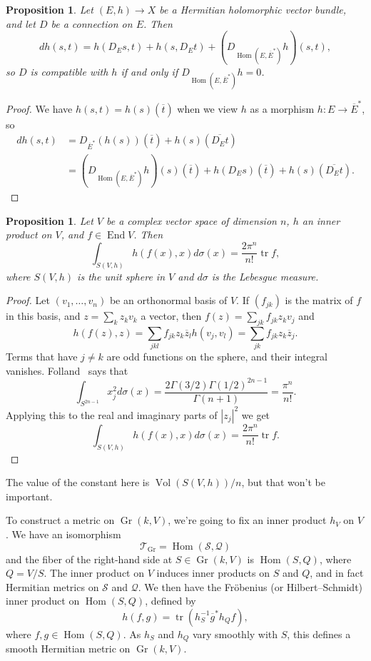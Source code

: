 \documentclass[11pt]{article}
\newtheorem{prop}[theo]{Proposition}
\newtheorem*{proof}{Proof}
\newcommand{\cc}[1]{\mathcal{#1}}
\def\ov#1{\overline{#1}}
\DeclareMathOperator{\Gr}{Gr}
\DeclareMathOperator{\Vol}{Vol}
\DeclareMathOperator{\End}{End}
\DeclareMathOperator{\Hom}{Hom}
\DeclareMathOperator{\tr}{tr}
\begin{document}
\begin{prop}
\label{prop:metric-parallel}
Let $(E,h) \to X$ be a Hermitian holomorphic vector bundle, and let $D$ be a connection on $E$. Then
\[
d h(s,t)
= h(D_Es, t) + h(s, D_Et)
+ (D_{\Hom(E,\overline E^*)}h)(s,t),
\]
so $D$ is compatible with $h$ if and only if $D_{\Hom(E,\overline E^*)}h = 0$.
\end{prop}

\begin{proof}
We have $h(s,t) = h(s)(\ov t)$ when we view $h$ as a morphism $h : E \to \ov E^*$, so
\begin{align*}
d h(s,t)
&= D_{\ov E^*}(h(s))(\ov t)
+ h(s)(\ov{D_Et})
\\
&= (D_{\Hom(E,\overline E^*)}h)(s)(\ov t)
+ h(D_E s)(\ov t)
+ h(s)(\ov{D_Et}).
\end{align*}
\end{proof}


\begin{prop}
\label{prop:trace-integral}
Let $V$ be a complex vector space of dimension $n$, $h$ an inner product on $V$, and $f \in \End V$. Then
\[
\int_{S(V,h)} h(f(x),x) d\sigma(x)
= \frac{2\pi^n}{n!} \tr f,
\]
where $S(V,h)$ is the unit sphere in $V$ and $d\sigma$ is the Lebesgue measure.
\end{prop}


\begin{proof}
Let $(v_1,\ldots,v_n)$ be an orthonormal basis of $V$. If $(f_{jk})$ is the matrix of $f$ in this basis, and $z = \sum_k z_k v_k$ a vector, then $f(z) = \sum_{jk} f_{jk} z_k v_j$ and
\[
h(f(z), z)
= \sum_{jkl} f_{jk} z_k \ov z_l h(v_j, v_l)
= \sum_{jk} f_{jk} z_k \ov z_j.
\]
Terms that have $j \not= k$ are odd functions on the sphere, and their integral vanishes. Folland~\cite{folland} says that
\[
\int_{S^{2n-1}} x_j^2 d\sigma(x)
= \frac{2\Gamma(3/2)\Gamma(1/2)^{2n-1}}{\Gamma(n+1)}
= \frac{\pi^n}{n!}.
\]
Applying this to the real and imaginary parts of $|z_j|^2$ we get
\[
\int_{S(V,h)} h(f(x),x) d\sigma(x)
= \frac{2\pi^n}{n!} \tr f.
\]
\end{proof}

The value of the constant here is $\Vol(S(V,h)) / n$, but that won't be important.


To construct a metric on $\Gr(k,V)$, we're going to fix an inner product $h_V$ on $V$. We have an isomorphism
\[
\cc T_{\Gr} = \Hom(\cc S, \cc Q)
\]
and the fiber of the right-hand side at $S \in \Gr(k,V)$ is $\Hom(S, Q)$, where $Q = V/S$. The inner product on $V$ induces inner products on $S$ and $Q$, and in fact Hermitian metrics on $\cc S$ and $\cc Q$. We then have the Fr\"obenius (or Hilbert--Schmidt) inner product on $\Hom(S,Q)$, defined by
\[
h(f, g) = \tr(h_S^{-1} \ov g^* h_Q f),
\]
where $f, g \in \Hom(S,Q)$. As $h_S$ and $h_Q$ vary smoothly with $S$, this defines a smooth Hermitian metric on $\Gr(k,V)$.
\end{document}
